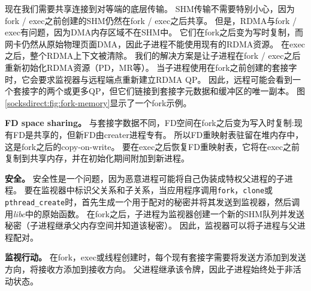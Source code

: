 现在我们需要共享连接到对等端的底层传输。
SHM传输不需要特别小心，因为fork / exec之前创建的SHM仍然在fork / exec之后共享。
但是，RDMA与fork / exec有问题，因为DMA内存区域不在SHM中。
它们在fork之后变为写时复制，而网卡仍然从原始物理页面DMA，因此子进程不能使用现有的RDMA资源。
在exec之后，整个RDMA上下文被清除。
我们的解决方案是让子进程在fork / exec之后重新初始化RDMA资源（PD，MR等）。
当子进程使用在fork之前创建的套接字时，它会要求监视器与远程端点重新建立RDMA QP。
因此，远程可能会看到一个套接字的两个或更多QP，但它们链接到套接字元数据和缓冲区的唯一副本。
图 \ref {socksdirect:fig:fork-memory}显示了一个fork示例。

\textbf {FD space sharing。}
与套接字数据不同，FD空间在fork之后变为写入时复制:现有FD是共享的，但新FD由creater进程专有。
所以FD重映射表驻留在堆内存中，这是fork之后的copy-on-write。
要在exec之后恢复FD重映射表，它将在exec之前复制到共享内存，并在\libipc {}初始化期间附加到新进程。

\textbf{安全。}
安全性是一个问题，因为恶意进程可能将自己伪装成特权父进程的子进程。
要在监视器中标识父关系和子关系，当应用程序调用\texttt {fork}，\texttt {clone}或\texttt {pthread\_create}时，\libipc {}首先生成一个用于配对的秘密并将其发送到监视器，然后调用\emph {libc}中的原始函数。
在fork之后，子进程为监视器创建一个新的SHM队列并发送秘密（子进程继承父内存空间并知道该秘密）。
因此，监视器可以将子进程与父进程配对。

\textbf {监视行动。}
在fork，exec或线程创建时，每个现有套接字需要将发送方添加到发送方向，将接收方添加到接收方向。
父进程继承该令牌，因此子进程始终处于非活动状态。



